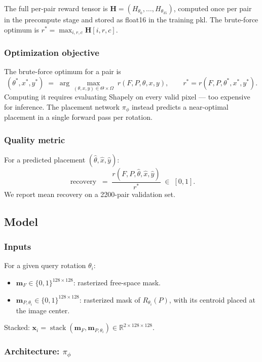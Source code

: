 \documentclass[11pt]{article}
\begin{document}
The full per-pair reward tensor is $\mathbf{H} = (H_{\theta_0}, \dots, H_{\theta_{35}})$, computed once per pair in the precompute stage and stored as float16 in the training pkl.  The brute-force optimum is $r^\ast = \max_{i,r,c} \mathbf{H}[i, r, c]$.

\subsubsection{Optimization objective}

The brute-force optimum for a pair is
\[
  (\theta^\ast, x^\ast, y^\ast) \;=\; \arg\max_{(\theta, x, y) \in \Theta \times \Omega} \; r(F, P, \theta, x, y),
  \qquad r^\ast = r(F, P, \theta^\ast, x^\ast, y^\ast).
\]
Computing it requires evaluating Shapely on every valid pixel --- too expensive for inference.  The placement network $\pi_\phi$ instead predicts a near-optimal placement in a single forward pass per rotation.

\subsubsection{Quality metric}

For a predicted placement $(\hat\theta, \hat x, \hat y)$:
\[
  \operatorname{recovery} \;=\; \frac{r(F, P, \hat\theta, \hat x, \hat y)}{r^\ast} \;\in\; [0, 1].
\]
We report mean recovery on a 2200-pair validation set.

\subsection{Model}

\subsubsection{Inputs}

For a given query rotation $\theta_i$:
\begin{itemize}[leftmargin=*,nosep]
  \item $\mathbf{m}_F \in \{0,1\}^{128\times128}$: rasterized free-space mask.
  \item $\mathbf{m}_{P,\theta_i} \in \{0,1\}^{128\times128}$: rasterized mask of $R_{\theta_i}(P)$, with its centroid placed at the image center.
\end{itemize}
Stacked: $\mathbf{x}_i = \operatorname{stack}(\mathbf{m}_F, \mathbf{m}_{P,\theta_i}) \in \mathbb{R}^{2\times128\times128}$.

\subsubsection{Architecture: $\pi_\phi$}
\end{document}
